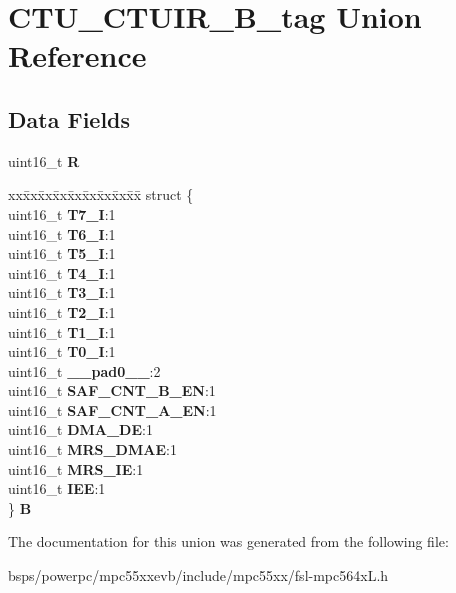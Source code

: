 \hypertarget{unionCTU__CTUIR__16B__tag}{}\section{C\+T\+U\+\_\+\+C\+T\+U\+I\+R\+\_\+B\+\_\+tag Union Reference}
\label{unionCTU__CTUIR__16B__tag}
\subsection*{Data Fields}
\begin{DoxyCompactItemize}
\item 
\mbox{\label{unionCTU__CTUIR__16B__tag_aedf900224201ed847beeee67c3a1d80e}} 
uint16\+\_\+t {\bfseries R}
\item 
\mbox{\label{unionCTU__CTUIR__16B__tag_a0e27129610103a9083c978e9c8e619c5}} 
\begin{tabbing}
xx\=xx\=xx\=xx\=xx\=xx\=xx\=xx\=xx\=\kill
struct \{\\
\>uint16\_t {\bfseries T7\_I}:1\\
\>uint16\_t {\bfseries T6\_I}:1\\
\>uint16\_t {\bfseries T5\_I}:1\\
\>uint16\_t {\bfseries T4\_I}:1\\
\>uint16\_t {\bfseries T3\_I}:1\\
\>uint16\_t {\bfseries T2\_I}:1\\
\>uint16\_t {\bfseries T1\_I}:1\\
\>uint16\_t {\bfseries T0\_I}:1\\
\>uint16\_t {\bfseries \_\_pad0\_\_}:2\\
\>uint16\_t {\bfseries SAF\_CNT\_B\_EN}:1\\
\>uint16\_t {\bfseries SAF\_CNT\_A\_EN}:1\\
\>uint16\_t {\bfseries DMA\_DE}:1\\
\>uint16\_t {\bfseries MRS\_DMAE}:1\\
\>uint16\_t {\bfseries MRS\_IE}:1\\
\>uint16\_t {\bfseries IEE}:1\\
\} {\bfseries B}\\

\end{tabbing}\end{DoxyCompactItemize}


The documentation for this union was generated from the following file\+:\begin{DoxyCompactItemize}
\item 
bsps/powerpc/mpc55xxevb/include/mpc55xx/fsl-\/mpc564x\+L.\+h\end{DoxyCompactItemize}
